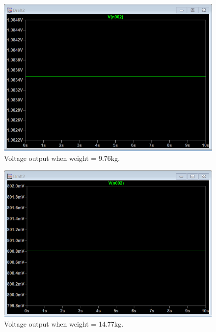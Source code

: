 \begin{figure}[h]
\centering
\includegraphics[width=\textwidth]{final-report/assets/10kg_sim.png}
\caption{Voltage output when weight = 9.76kg.}
\end{figure}

\begin{figure}[h]
\centering
\includegraphics[width=\textwidth]{final-report/assets/15kg_sim.png}
\caption{Voltage output when weight = 14.77kg.}
\end{figure}

